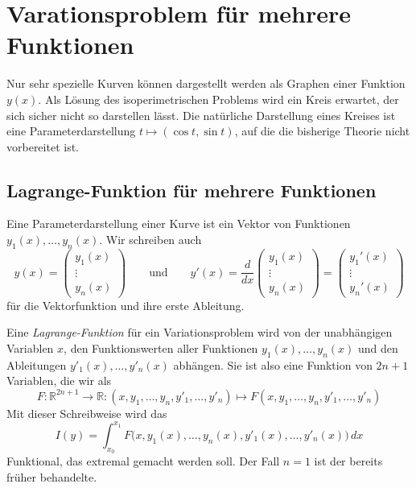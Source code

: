 %
%
%
\section{Varationsproblem für mehrere Funktionen
\label{buch:variation:section:mehrerefunktionen}}
Nur sehr spezielle Kurven können dargestellt werden als Graphen
einer Funktion $y(x)$.
Als Lösung des isoperimetrischen Problems wird ein Kreis erwartet,
der sich sicher nicht so darstellen lässt.
Die natürliche Darstellung eines Kreises ist eine Parameterdarstellung
$t\mapsto(\cos t,\sin t)$, auf die die bisherige Theorie nicht
vorbereitet ist.

%
%
\subsection{Lagrange-Funktion für mehrere Funktionen
\label{buch:variation:mehrerefunction:subsection:lagrangefunktion}}
Eine Parameterdarstellung einer Kurve ist ein Vektor von Funktionen
$y_1(x),\dots,y_n(x)$.
Wir schreiben auch
\[
y(x)
=
\begin{pmatrix}
y_1(x)\\
\vdots\\
y_n(x)
\end{pmatrix}
\qquad\text{und}\qquad
y'(x)
=
\frac{d}{dx}
\begin{pmatrix}
y_1(x)\\
\vdots\\
y_n(x)
\end{pmatrix}
=
\begin{pmatrix}
y_1'(x)\\
\vdots\\
y_n'(x)
\end{pmatrix}
\]
für die Vektorfunktion und ihre erste Ableitung.

Eine {\em Lagrange-Funktion} für ein Variationsproblem wird von
der unabhängigen Variablen $x$, den Funktionswerten aller Funktionen
$y_1(x),\dots,y_n(x)$ und den Ableitungen $y'_1(x),\dots,y'_n(x)$
abhängen.
Sie ist also eine Funktion von $2n+1$ Variablen, die wir als
\begin{equation*}
F
\colon
\mathbb{R}^{2n+1}\to\mathbb{R}
:
(x,y_1,\dots,y_n,y'_1,\dots,y'_n)\mapsto F(x,y_1,\dots,y_n,y'_1,\dots,y'_n)
\end{equation*}
Mit dieser Schreibweise wird das
\[
I(y)
=
\int_{x_0}^{x_1}
F\bigl(x,y_1(x),\dots,y_n(x),y'_1(x),\dots,y'_n(x)\bigr)\,dx
\]
Funktional, das extremal gemacht werden soll.
Der Fall $n=1$ ist der bereits früher behandelte.

